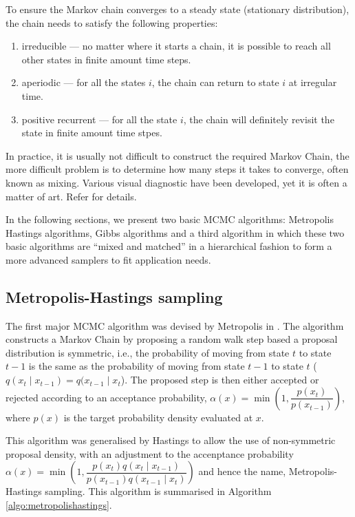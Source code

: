 To ensure the Markov chain converges to a steady state (stationary distribution), the chain needs to satisfy the following properties:
\begin{enumerate}
\item irreducible --- no matter where it starts a chain, it is possible to reach all other states in finite amount time steps.
\item aperiodic --- 	for all the states $i$, the chain can  return to state $i$ at irregular time.
\item positive recurrent --- for all the state $i$, the chain will definitely revisit the state in finite amount time stpes.
\end{enumerate}

In practice, it is usually not difficult to construct the required Markov Chain, the more difficult problem is to determine how many steps it takes to converge, often known as mixing. Various visual diagnostic have been developed, yet it is often a matter of art. Refer \cite{RCP05} for details.

In the following sections, we present two basic MCMC algorithms: Metropolis Hastings algorithms, Gibbs algorithms and a third algorithm in which these two basic algorithms are ``mixed and matched'' in a hierarchical fashion to form a more advanced samplers to fit application needs.

\subsection{Metropolis-Hastings sampling}
The first major MCMC algorithm was devised by Metropolis in \cite{MN53}. The algorithm constructs a Markov Chain by proposing a random walk step based a proposal distribution is symmetric, i.e., the probability of moving from state $t$ to state $t-1$ is the same as the probability of moving from state $t-1$ to state $t$ ($q(x_{t} \mid x_{t-1}) = q(x_{t-1} \mid x_{t}$). The proposed step is then either accepted or rejected according to an acceptance probability, $\alpha(x)= \min\left(1, \dfrac{p(x_t)}{p(x_{t-1})}\right)$, where $p(x)$ is the target probability density evaluated at $x$.

This algorithm was generalised by Hastings \cite{WKH70} to allow the use of non-symmetric proposal density, with an adjustment to the accenptance probability $\alpha(x) = \min\left(1, \dfrac{p(x_t)q(x_t \mid x_{t-1})}{p(x_{t-1})q(x_{t-1} \mid x_{t})}\right)$ and hence the name, Metropolis-Hastings sampling. This algorithm is summarised in Algorithm \ref{algo:metropolishastings}.


